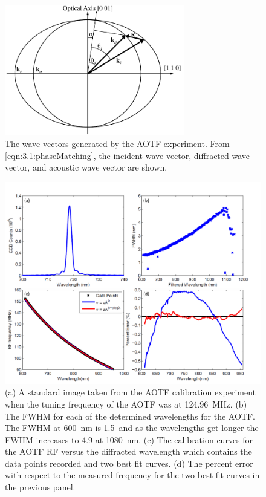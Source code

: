 \documentclass[12pt]{article}
\begin{document}
\begin{figure}
    \begin{center}
    \includegraphics[width=0.7\textwidth]{./Images/3-1-AOTFWavevectorWithRefraction.pdf}
    \caption{The wave vectors generated by the AOTF experiment. From \autoref{eqn:3.1:phaseMatching}, the incident wave vector, diffracted wave vector, and acoustic wave vector are shown.}
    \label{fig:3.1:ATOFWavevectors}
    \end{center}
\end{figure}

\newpage

\begin{figure}
    \includegraphics[width=1.0\textwidth]{./Images/3-1-AOTFCharaterization.pdf}
    \caption{(a) A standard image taken from the AOTF calibration experiment when the tuning frequency of the AOTF was at 124.96~MHz. (b) The FWHM for each of the determined wavelengths for the AOTF. The FWHM at 600~nm is 1.5~and as the wavelengths get longer the FWHM increases to 4.9 at 1080~nm. (c) The calibration curves for the AOTF RF versus the  diffracted wavelength which contains the data points recorded and two best fit curves. (d) The percent error with respect to the measured frequency for the two best fit curves in the previous panel.}
    \label{fig:3.1:AOTFCharaterization}
\end{figure}
\end{document}

